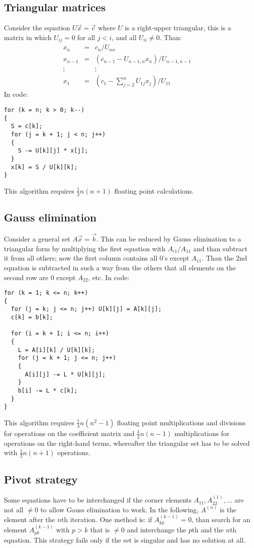 \documentclass[a4paper,fancyheadings,twoside]{report}
\begin{document}
\subsection{Triangular matrices}
Consider the equation $U\vec{x}=\vec{c}$ where $U$ is a right-upper triangular,
this is a matrix in which $U_{ij}=0$ for all $j<i$, and all $U_{ii}\neq0$. Than:
\begin{eqnarray*}
x_n    &=&c_n/U_{nn}\\
x_{n-1}&=&(c_{n-1}-U_{n-1,n}x_n)/U_{n-1,n-1}\\
\vdots & &\vdots\\
x_1    &=&(c_1-\sum_{j=2}^nU_{1j}x_j)/U_{11}
\end{eqnarray*}
In code:
\begin{verbatim}
for (k = n; k > 0; k--)
{
  S = c[k];
  for (j = k + 1; j < n; j++)
  {
    S -= U[k][j] * x[j];
  }
  x[k] = S / U[k][k];
}
\end{verbatim}
This algorithm requires $\frac{1}{2}n(n+1)$ floating point calculations.

\subsection{Gauss elimination}
Consider a general set $A\vec{x}=\vec{b}$. This can be reduced by Gauss
elimination to a triangular form by multiplying the first equation with
$A_{i1}/A_{11}$ and than subtract it from all others; now the first column
contains all 0's except $A_{11}$. Than the 2nd equation is subtracted in
such a way from the others that all elements on the second row are 0 except
$A_{22}$, etc. In code:
\begin{verbatim}
for (k = 1; k <= n; k++)
{
  for (j = k; j <= n; j++) U[k][j] = A[k][j];
  c[k] = b[k];

  for (i = k + 1; i <= n; i++)
  {
    L = A[i][k] / U[k][k];
    for (j = k + 1; j <= n; j++)
    {
      A[i][j] -= L * U[k][j];
    }
    b[i] -= L * c[k];
  }
}
\end{verbatim}
This algorithm requires $\frac{1}{3}n(n^2-1)$ floating point multiplications
and divisions for operations on the coefficient matrix and $\frac{1}{2}n(n-1)$
multiplications for operations on the right-hand terms, whereafter the
triangular set has to be solved with $\frac{1}{2}n(n+1)$ operations.

\subsection{Pivot strategy}
Some equations have to be interchanged if the corner elements
$A_{11}, A^{(1)}_{22},...$ are not all $\neq0$ to allow Gauss elimination to
work. In the following, $A^{(n)}$ is the element after the $n$th iteration.
One method is: if $A^{(k-1)}_{kk}=0$, than search for an element $A^{(k-1)}_{pk}$
with $p>k$ that is $\neq0$ and interchange the $p$th and the $n$th equation. This
strategy fails only if the set is singular and has no solution at all.
\end{document}
